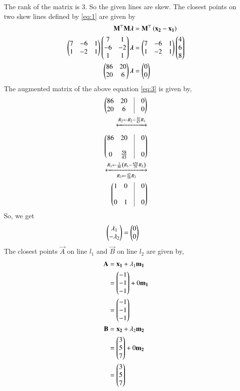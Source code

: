 \documentclass[journal,12pt,twocolumn]{IEEEtran}
\begin{document}
The rank of the matrix is 3. So the given lines are skew.
The closest points on two skew lines defined by \eqref{eq:1} are given by 
\begin{align}
\mathbf{M}^\top \mathbf{M}\bm{\lambda} &= \mathbf{M}^\top\left(\mathbf{x_2}-\mathbf{x_1}\right)\\
\begin{pmatrix}7&-6&1\\1&-2&1\end{pmatrix} \begin{pmatrix}7&1\\-6&-2\\1&1\end{pmatrix}\bm{\lambda} &= \begin{pmatrix}7&-6&1\\1&-2&1\end{pmatrix} \begin{pmatrix}4\\6\\8\end{pmatrix}\\
\begin{pmatrix}86&20\\20&6\end{pmatrix}\bm{\lambda} &= \begin{pmatrix}0\\0\end{pmatrix}
\label{eq:3}
\end{align}
The augmented matrix of the above equation \eqref{eq:3} is given by,
\begin{align}
\myvec{86&20&\vrule&0\\20&6&\vrule&0}\\
\xleftrightarrow{R_2 \leftarrow R_2 - \frac{10}{43}R_1}
\end{align}
\begin{align}
\myvec{86&20&\vrule&0 \\&&\vrule\\ 0&\frac{58}{43}&\vrule&0}\\
\xleftrightarrow[R_2 \leftarrow \frac{43}{58}R_2]{R_1 \leftarrow \frac{1}{86} \brak{R_1 - \frac{430}{29}R_2}}\\
\myvec{1&0&\vrule&0 \\&&\vrule\\ 0&1&\vrule&0}
\end{align}
So, we get
\begin{align}
\begin{pmatrix}\lambda_1\\-\lambda_2\end{pmatrix} &= \begin{pmatrix}0\\0\end{pmatrix}
\end{align}
The closest points $\vec{A}$ on line $l_1$ and $\vec{B}$ on line $l_2$ are given by,
\begin{align}
\mathbf{A} &= \mathbf{x_1} + \lambda_1\mathbf{m_1}\\
&=  \begin{pmatrix}-1\\-1\\-1\end{pmatrix} + 0\mathbf{m_1}\\
&= \begin{pmatrix}-1\\-1\\-1\end{pmatrix}\\
\mathbf{B} &= \mathbf{x_2} + \lambda_2\mathbf{m_2}\\
&= \begin{pmatrix}3\\5\\7\end{pmatrix} + 0\mathbf{m_2}\\
&= \begin{pmatrix}3\\5\\7\end{pmatrix}
\end{align}
\end{document}
